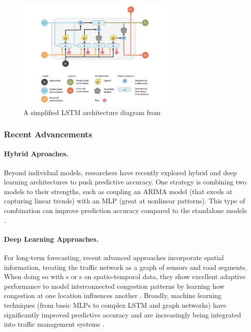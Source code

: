 \begin{figure}[!ht]
  \centering
  \includegraphics[width=0.7\textwidth]{images/background/lstm.pdf}
  \caption[A simplified LSTM architecture diagram]{A simplified LSTM architecture diagram from~\cite{yan_understanding_2017}}
  \label{fig:LSTM}
\end{figure} 

\subsubsection{Recent Advancements}
\paragraph{Hybrid Aproaches.} Beyond individual models, researchers have recently explored hybrid and deep learning architectures to push predictive accuracy. One strategy is combining two models to their strengths, such as coupling an ARIMA model (that excels at capturing linear trends) with an MLP (great at nonlinear patterns). This type of combination can improve prediction accuracy compared to the standalone models \cite{v_hybrid_2022}.

\paragraph{Deep Learning Approaches.} For long-term forecasting, recent advanced approaches incorporate spatial information, treating the traffic network as a graph of sensors and road segments. When doing so with s or s on spatio-temporal data, they show excellent adaptive performance to model interconnected congestion patterns by learning how congestion at one location influences another \cite{jiang_graph_2022, ma_learning_2017}. Broadly, machine learning techniques (from basic MLPs to complex LSTM and graph networks) have significantly improved predictive accuracy and are increasingly being integrated into traffic management systems \cite{kumar_applications_2021}.


